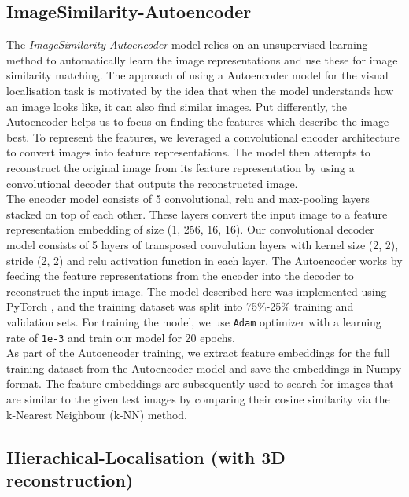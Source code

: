 \documentclass[conference]{IEEEtran}
\begin{document}
\subsection{ImageSimilarity-Autoencoder}
\label{auto-encoders}
The \textit{ImageSimilarity-Autoencoder} model relies on an unsupervised learning method to automatically learn the image representations and use these for image similarity matching. The approach of using a Autoencoder model for the visual localisation task is motivated by the idea that when the model understands how an image looks like, it can also find similar images. Put differently, the Autoencoder helps us to focus on finding the features which describe the image best. 
To represent the features, we leveraged a convolutional encoder architecture to convert images into feature representations. The model then attempts to reconstruct the original image from its feature representation by using a convolutional decoder that outputs the reconstructed image.\\
The encoder model consists of 5 convolutional, relu and max-pooling layers stacked on top of each other. These layers convert the input image to a feature representation embedding of size (1, 256, 16, 16). Our convolutional decoder model consists of 5 layers of transposed convolution layers with kernel size (2, 2), stride (2, 2) and relu activation function in each layer. The Autoencoder works by feeding the feature representations from the encoder into the decoder to reconstruct the input image. The model described here was implemented using PyTorch \cite{b4}, and the training dataset was split into 75\%-25\% training and validation sets. For training the model, we use \texttt{Adam} optimizer with a learning rate of \texttt{1e-3} and train our model for 20 epochs.\\
As part of the Autoencoder training, we extract feature embeddings for the full training dataset from the Autoencoder model and save the embeddings in Numpy format. The feature embeddings are subsequently used to search for images that are similar to the given test images by comparing their cosine similarity via the k-Nearest Neighbour (k-NN) method.


\subsection{Hierachical-Localisation (with 3D reconstruction)}
\end{document}
